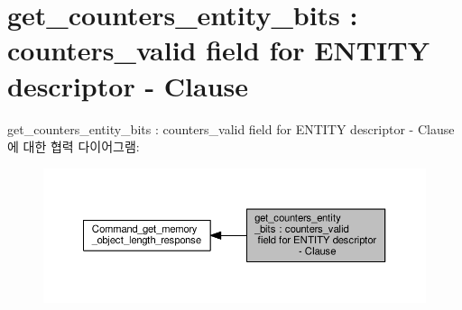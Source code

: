 \hypertarget{group__get__counters__entity__bits}{}\section{get\+\_\+counters\+\_\+entity\+\_\+bits \+: counters\+\_\+valid field for E\+N\+T\+I\+TY descriptor -\/ Clause}
\label{group__get__counters__entity__bits}
get\+\_\+counters\+\_\+entity\+\_\+bits \+: counters\+\_\+valid field for E\+N\+T\+I\+TY descriptor -\/ Clause에 대한 협력 다이어그램\+:
\nopagebreak
\begin{figure}[H]
\begin{center}
\leavevmode
\includegraphics[width=350pt]{group__get__counters__entity__bits}
\end{center}
\end{figure}
